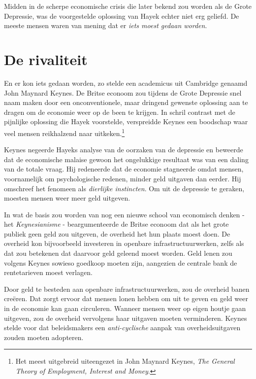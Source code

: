 \documentclass[
  a5paper,
  smalldemyvopaper,11pt,twoside,onecolumn,openright,extrafontsizes,
hidelinks]{memoir}
\begin{document}
Midden in de scherpe economische crisis die later bekend zou worden als
de Grote Depressie, was de voorgestelde oplossing van Hayek echter niet
erg geliefd. De meeste mensen waren van mening dat er \emph{iets moest
gedaan worden}.

\section{De rivaliteit}\label{de-rivaliteit}

En er kon iets gedaan worden, zo stelde een academicus uit Cambridge
genaamd John Maynard Keynes. De Britse econoom zou tijdens de Grote
Depressie snel naam maken door een onconventionele, maar dringend
gewenste oplossing aan te dragen om de economie weer op de been te
krijgen. In schril contrast met de pijnlijke oplossing die Hayek
voorstelde, verspreidde Keynes een boodschap waar veel mensen
reikhalzend naar uitkeken.\footnote{Het meest uitgebreid uiteengezet in
  John Maynard Keynes, \emph{The General Theory of Employment, Interest
  and Money}.}

Keynes negeerde Hayeks analyse van de oorzaken van de depressie en
beweerde dat de economische malaise gewoon het ongelukkige resultaat was
van een daling van de totale vraag. Hij redeneerde dat de economie
stagneerde omdat mensen, voornamelijk om psychologische redenen, minder
geld uitgaven dan eerder. Hij omschreef het fenomeen als \emph{dierlijke
instincten}. Om uit de depressie te geraken, moesten mensen weer meer
geld uitgeven.

In wat de basis zou worden van nog een nieuwe school van economisch
denken - het \emph{Keynesianisme} - beargumenteerde de Britse econoom
dat als het grote publiek geen geld zou uitgeven, de overheid het hun
plaats moest doen. De overheid kon bijvoorbeeld investeren in openbare
infrastructuurwerken, zelfs als dat zou betekenen dat daarvoor geld
geleend moest worden. Geld lenen zou volgens Keynes sowieso goedkoop
moeten zijn, aangezien de centrale bank de rentetarieven moest verlagen.

Door geld te besteden aan openbare infrastructuurwerken, zou de overheid
banen creëren. Dat zorgt ervoor dat mensen lonen hebben om uit te geven
en geld weer in de economie kan gaan circuleren. Wanneer mensen weer op
eigen houtje gaan uitgeven, zou de overheid vervolgens haar uitgaven
moeten verminderen. Keynes stelde voor dat beleidsmakers een
\emph{anti-cyclische} aanpak van overheidsuitgaven zouden moeten
adopteren.
\end{document}
